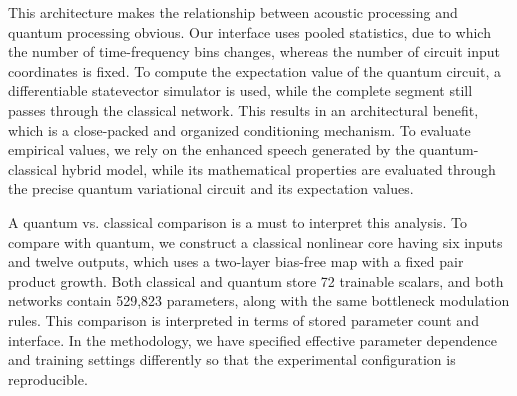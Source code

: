 \documentclass[10pt,a4paper]{article}
\begin{document}
This architecture makes the relationship between acoustic processing and quantum processing obvious. Our interface uses pooled statistics, due to which the number of time-frequency bins changes, whereas the number of circuit input coordinates is fixed. To compute the expectation value of the quantum circuit, a differentiable statevector simulator is used, while the complete segment still passes through the classical network. This results in an architectural benefit, which is a close-packed and organized conditioning mechanism. To evaluate empirical values, we rely on the enhanced speech generated by the quantum-classical hybrid model, while its mathematical properties are evaluated through the precise quantum variational circuit and its expectation values. 


A quantum vs. classical comparison is a must to interpret this analysis. To compare with quantum, we construct a classical nonlinear core having six inputs and twelve outputs, which uses a two-layer bias-free map with a fixed pair product growth. Both classical and quantum store 72 trainable scalars, and both networks contain 529,823 parameters, along with the same bottleneck modulation rules. This comparison is interpreted in terms of stored parameter count and interface. In the methodology, we have specified effective parameter dependence and training settings differently so that the experimental configuration is reproducible.

\end{document}
